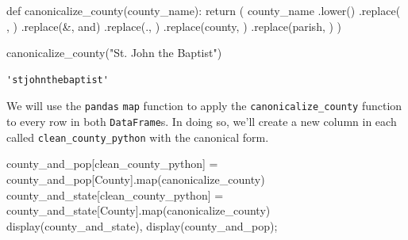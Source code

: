 \documentclass[
  letterpaper,
  DIV=11,
  numbers=noendperiod]{scrreprt}
\newenvironment{Shaded}{\begin{snugshade}}{\end{snugshade}}
\newcommand{\BuiltInTok}[1]{\textcolor[rgb]{0.00,0.23,0.31}{#1}}
\newcommand{\ControlFlowTok}[1]{\textcolor[rgb]{0.00,0.23,0.31}{#1}}
\newcommand{\KeywordTok}[1]{\textcolor[rgb]{0.00,0.23,0.31}{#1}}
\newcommand{\NormalTok}[1]{\textcolor[rgb]{0.00,0.23,0.31}{#1}}
\newcommand{\OperatorTok}[1]{\textcolor[rgb]{0.37,0.37,0.37}{#1}}
\newcommand{\StringTok}[1]{\textcolor[rgb]{0.13,0.47,0.30}{#1}}
\begin{document}
\begin{Shaded}
\begin{Highlighting}[]
\KeywordTok{def}\NormalTok{ canonicalize\_county(county\_name):}
    \ControlFlowTok{return}\NormalTok{ (}
\NormalTok{        county\_name}
\NormalTok{            .lower()}
\NormalTok{            .replace(}\StringTok{\textquotesingle{} \textquotesingle{}}\NormalTok{, }\StringTok{\textquotesingle{}\textquotesingle{}}\NormalTok{)}
\NormalTok{            .replace(}\StringTok{\textquotesingle{}\&\textquotesingle{}}\NormalTok{, }\StringTok{\textquotesingle{}and\textquotesingle{}}\NormalTok{)}
\NormalTok{            .replace(}\StringTok{\textquotesingle{}.\textquotesingle{}}\NormalTok{, }\StringTok{\textquotesingle{}\textquotesingle{}}\NormalTok{)}
\NormalTok{            .replace(}\StringTok{\textquotesingle{}county\textquotesingle{}}\NormalTok{, }\StringTok{\textquotesingle{}\textquotesingle{}}\NormalTok{)}
\NormalTok{            .replace(}\StringTok{\textquotesingle{}parish\textquotesingle{}}\NormalTok{, }\StringTok{\textquotesingle{}\textquotesingle{}}\NormalTok{)}
\NormalTok{    )}

\NormalTok{canonicalize\_county(}\StringTok{"St. John the Baptist"}\NormalTok{)}
\end{Highlighting}
\end{Shaded}

\begin{verbatim}
'stjohnthebaptist'
\end{verbatim}

We will use the \texttt{pandas} \texttt{map} function to apply the
\texttt{canonicalize\_county} function to every row in both
\texttt{DataFrame}s. In doing so, we'll create a new column in each
called \texttt{clean\_county\_python} with the canonical form.

\begin{Shaded}
\begin{Highlighting}[]
\NormalTok{county\_and\_pop[}\StringTok{\textquotesingle{}clean\_county\_python\textquotesingle{}}\NormalTok{] }\OperatorTok{=}\NormalTok{ county\_and\_pop[}\StringTok{\textquotesingle{}County\textquotesingle{}}\NormalTok{].}\BuiltInTok{map}\NormalTok{(canonicalize\_county)}
\NormalTok{county\_and\_state[}\StringTok{\textquotesingle{}clean\_county\_python\textquotesingle{}}\NormalTok{] }\OperatorTok{=}\NormalTok{ county\_and\_state[}\StringTok{\textquotesingle{}County\textquotesingle{}}\NormalTok{].}\BuiltInTok{map}\NormalTok{(canonicalize\_county)}
\NormalTok{display(county\_and\_state), display(county\_and\_pop)}\OperatorTok{;}
\end{Highlighting}
\end{Shaded}
\end{document}
